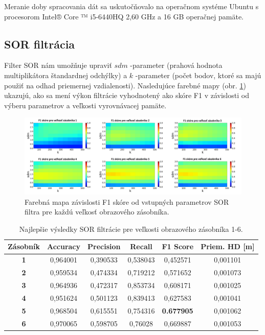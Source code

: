 Meranie doby spracovania dát sa uskutočňovalo na operačnom systéme Ubuntu s procesorom Intel® Core ™ i5-6440HQ 2,60 GHz a 16 GB operačnej pamäte. 

\subsection{SOR filtrácia}

Filter SOR nám umožňuje upraviť $sdm$ -parameter (prahová hodnota multiplikátora štandardnej odchýlky) a $k$ -parameter (počet bodov, ktoré sa majú použiť na odhad priemernej vzdialenosti). Nasledujúce farebné mapy (obr. \ref{fig:sorf1}) ukazujú, ako sa mení výkon filtrácie vyhodnotený ako skóre F1 v závislosti od výberu parametrov a veľkosti vyrovnávacej pamäte.

\begin{figure}[h]
	\centering
	\includegraphics[width=\textwidth]{figures/sor_f1.png}
	\caption{Farebná mapa závislosti F1 skóre od vstupných parametrov SOR filtra pre každú veľkosť obrazového zásobníka.}
	\label{fig:sorf1}
\end{figure}

\begin{table}[h]
	\centering
	\caption{\label{tab:sor_best} Najlepšie výsledky SOR filtrácie pre veľkosti obrazového zásobníka 1-6. }
	\begin{tabular}{cccccc}
		\toprule
		\textbf{Zásobník} & \textbf{Accuracy} & \textbf{Precision} & \textbf{Recall} & \textbf{F1 Score} & \textbf{Priem. HD [m]} \\ 
		\midrule
		\textbf{1}           & 0,964001          & 0,390533           & 0,538043        & 0,452571          & 0,001101           \\ 
		\textbf{2}           & 0,959534          & 0,474334           & 0,719212        & 0,571652          & 0,001073           \\ 
		\textbf{3}           & 0,964936          & 0,472317           & 0,853734        & 0,608171          & 0,001025           \\ 
		\textbf{4}           & 0,951624          & 0,501123           & 0,839413        & 0,627583          & 0,001041           \\ 
		\textbf{5}           & 0,968504          & 0,615551           & 0,754316        & \textbf{0.677905}          & 0,001062           \\ 
		\textbf{6}           & 0,970065          & 0,598705           & 0,76028         & 0,669887          & 0,001053           \\ 
		\bottomrule
	\end{tabular}
\end{table}

